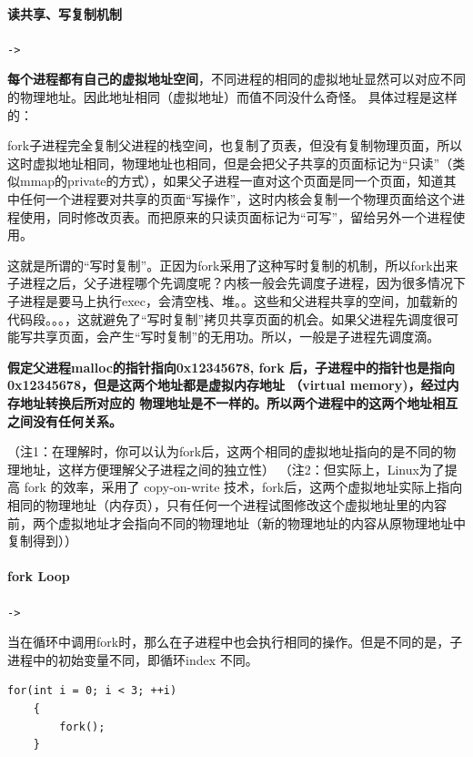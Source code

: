 \documentclass[UTF8,a4paper,12pt]{ctexbook}
\begin{document}
			\paragraph{读共享、写复制机制}\verb|->|
	
				\textbf{每个进程都有自己的虚拟地址空间}，不同进程的相同的虚拟地址显然可以对应不同的物理地址。因此地址相同（虚拟地址）而值不同没什么奇怪。
				具体过程是这样的：
				
				fork子进程完全复制父进程的栈空间，也复制了页表，但没有复制物理页面，所以这时虚拟地址相同，物理地址也相同，但是会把父子共享的页面标记为“只读”（类似mmap的private的方式），如果父子进程一直对这个页面是同一个页面，知道其中任何一个进程要对共享的页面“写操作”，这时内核会复制一个物理页面给这个进程使用，同时修改页表。而把原来的只读页面标记为“可写”，留给另外一个进程使用。
				
				这就是所谓的“写时复制”。正因为fork采用了这种写时复制的机制，所以fork出来子进程之后，父子进程哪个先调度呢？内核一般会先调度子进程，因为很多情况下子进程是要马上执行exec，会清空栈、堆。。这些和父进程共享的空间，加载新的代码段。。。，这就避免了“写时复制”拷贝共享页面的机会。如果父进程先调度很可能写共享页面，会产生“写时复制”的无用功。所以，一般是子进程先调度滴。
				
				\textbf{假定父进程malloc的指针指向0x12345678, fork 后，子进程中的指针也是指向0x12345678，但是这两个地址都是虚拟内存地址 （virtual memory)，经过内存地址转换后所对应的 物理地址是不一样的。所以两个进程中的这两个地址相互之间没有任何关系。}
				
			
				（注1：在理解时，你可以认为fork后，这两个相同的虚拟地址指向的是不同的物理地址，这样方便理解父子进程之间的独立性）
				（注2：但实际上，Linux为了提高 fork 的效率，采用了 copy-on-write 技术，fork后，这两个虚拟地址实际上指向相同的物理地址（内存页），只有任何一个进程试图修改这个虚拟地址里的内容前，两个虚拟地址才会指向不同的物理地址（新的物理地址的内容从原物理地址中复制得到））
				
			
			\paragraph{fork Loop}\verb|->|
			
				当在循环中调用fork时，那么在子进程中也会执行相同的操作。但是不同的是，子进程中的初始变量不同，即循环index 不同。
					\begin{lstlisting}[frame = L, xleftmargin = .1\textwidth]
	for(int i = 0; i < 3; ++i)
	{
		fork();
	}
					\end{lstlisting}
			
\end{document}
